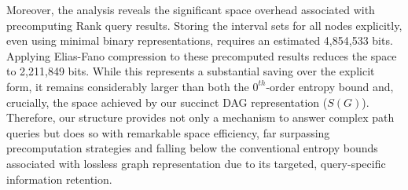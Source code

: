 Moreover, the analysis reveals the significant space overhead associated with precomputing Rank query results. Storing the interval sets for all nodes explicitly, even using minimal binary representations, requires an estimated 4,854,533 bits. Applying Elias-Fano compression to these precomputed results reduces the space to 2,211,849 bits. While this represents a substantial saving over the explicit form, it remains considerably larger than both the $0^{th}$-order entropy bound and, crucially, the space achieved by our succinct DAG representation ($S(G)$). Therefore, our structure provides not only a mechanism to answer complex path queries but does so with remarkable space efficiency, far surpassing precomputation strategies and falling below the conventional entropy bounds associated with lossless graph representation due to its targeted, query-specific information retention.
